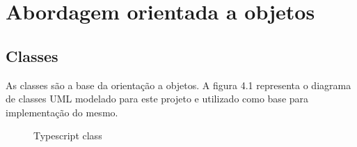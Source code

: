 \documentclass[rel_mlp]{iiufrgs}
\numberwithin{figure}{chapter}
\begin{document}
%
\chapter{Abordagem orientada a objetos}

\section{Classes}

As classes são a base da orientação a objetos. A figura 4.1 representa o diagrama de classes UML modelado para este projeto e utilizado como base para implementação do mesmo.
\begin{figure}[ht]
%
%
\caption{Typescript class}
\label{fig:tsClass}
\end{figure}
\end{document}
